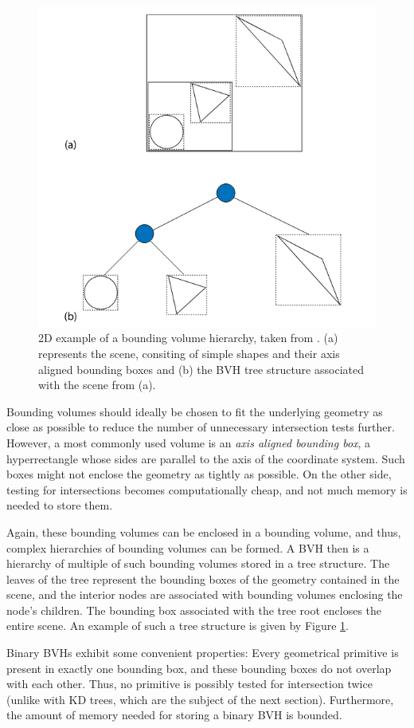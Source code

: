 \begin{figure}
	\centering
	\includegraphics[width=.7\linewidth]{img/1 fundamentals/bvh.png}
	\caption{2D example of a bounding volume hierarchy, taken from \cite{pharr2016physically}. (a) represents the scene, consiting of simple shapes and their axis aligned bounding boxes and (b) the BVH tree structure associated with the scene from (a).}
	\label{fig:bvh}
\end{figure}

Bounding volumes should ideally be chosen to fit the underlying geometry as close as possible to reduce the number of unnecessary intersection tests further. However, a most commonly used volume is an \emph{axis aligned bounding box}, a hyperrectangle whose sides are parallel to the axis of the coordinate system. Such boxes might not enclose the geometry as tightly as possible. On the other side, testing for intersections becomes computationally cheap, and not much memory is needed to store them.

Again, these bounding volumes can be enclosed in a bounding volume, and thus, complex hierarchies of bounding volumes can be formed.
A BVH then is a hierarchy of multiple of such bounding volumes stored in a tree structure. The leaves of the tree represent the bounding boxes of the geometry contained in the scene, and the interior nodes are associated with bounding volumes enclosing the node's children. The bounding box associated with the tree root encloses the entire scene. An example of such a tree structure is given by Figure \ref{fig:bvh}.

Binary BVHs exhibit some convenient properties:  Every geometrical primitive is present in exactly one bounding box, and these bounding boxes do not overlap with each other. Thus, no primitive is possibly tested for intersection twice (unlike with KD trees, which are the subject of the next section). Furthermore, the amount of memory needed for storing a binary BVH is bounded. 


